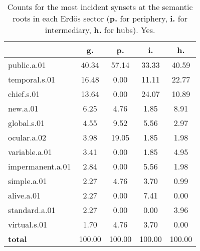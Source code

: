 \begin{table}[h!]
\begin{center}
\begin{tabular}{| l || c | c | c | c |}\hline
 & {\bf g.} & {\bf p.} & {\bf i.} & {\bf h.} \\\hline\hline
public.a.01 & 40.34  & 57.14  & 33.33  & 40.59 \\\hline
temporal.s.01 & 16.48  & 0.00  & 11.11  & 22.77 \\\hline
chief.s.01 & 13.64  & 0.00  & 24.07  & 10.89 \\\hline
new.a.01 & 6.25  & 4.76  & 1.85  & 8.91 \\\hline
global.s.01 & 4.55  & 9.52  & 5.56  & 2.97 \\\hline
ocular.a.02 & 3.98  & 19.05  & 1.85  & 1.98 \\\hline
variable.a.01 & 3.41  & 0.00  & 1.85  & 4.95 \\\hline
impermanent.a.01 & 2.84  & 0.00  & 5.56  & 1.98 \\\hline
simple.a.01 & 2.27  & 4.76  & 3.70  & 0.99 \\\hline
alive.a.01 & 2.27  & 0.00  & 7.41  & 0.00 \\\hline
standard.a.01 & 2.27  & 0.00  & 0.00  & 3.96 \\\hline
virtual.s.01 & 1.70  & 4.76  & 3.70  & 0.00 \\\hline\hline
{{\bf total}} & 100.00  & 100.00  & 100.00  & 100.00 \\\hline
\end{tabular}
\caption{Counts for the most incident synsets at the semantic roots in each Erd\"os sector ({\bf p.} for periphery, {\bf i.} for intermediary, {\bf h.} for hubs). Yes.}
\end{center}
\end{table}

